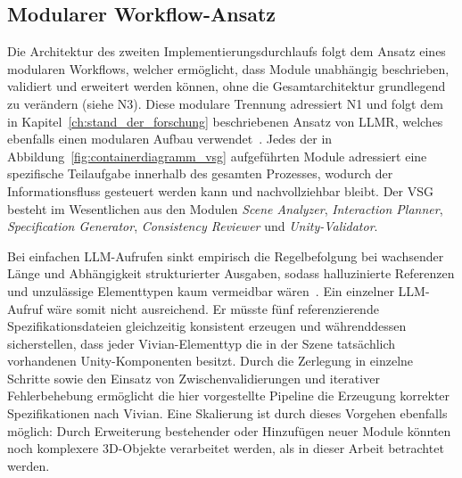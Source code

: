 \subsection{Modularer Workflow-Ansatz}\label{sec:begründung_modularer_workflow}

Die Architektur des zweiten Implementierungsdurchlaufs folgt dem Ansatz eines modularen Workflows, welcher ermöglicht, dass Module unabhängig beschrieben, validiert und erweitert werden können, ohne die Gesamtarchitektur grundlegend zu verändern (siehe N3).
Diese modulare Trennung adressiert N1 und folgt dem in Kapitel~\ref{ch:stand_der_forschung} beschriebenen Ansatz von LLMR, welches ebenfalls einen modularen Aufbau verwendet~\cite{delatorreLLMRRealtimePrompting2024}.
Jedes der in Abbildung~\ref{fig:containerdiagramm_vsg} aufgeführten Module adressiert eine spezifische Teilaufgabe innerhalb des gesamten Prozesses, wodurch der Informationsfluss gesteuert werden kann und nachvollziehbar bleibt.
Der VSG besteht im Wesentlichen aus den Modulen \textit{Scene Analyzer}, \textit{Interaction Planner}, \textit{Specification Generator}, \textit{Consistency Reviewer} und \textit{Unity-Validator}.

Bei einfachen LLM-Aufrufen sinkt empirisch die Regelbefolgung bei wachsender Länge und Abhängigkeit strukturierter Ausgaben, sodass halluzinierte Referenzen und unzulässige Elementtypen kaum vermeidbar wären~\cite{zhangLostintheMiddleLongTextGeneration2025}.
Ein einzelner LLM-Aufruf wäre somit nicht ausreichend. Er müsste fünf referenzierende Spezifikationsdateien gleichzeitig konsistent erzeugen und währenddessen sicherstellen, dass jeder Vivian-Elementtyp die in der Szene tatsächlich vorhandenen Unity-Komponenten besitzt.
Durch die Zerlegung in einzelne Schritte sowie den Einsatz von Zwischenvalidierungen und iterativer Fehlerbehebung ermöglicht die hier vorgestellte Pipeline die Erzeugung korrekter Spezifikationen nach Vivian.
Eine Skalierung ist durch dieses Vorgehen ebenfalls möglich: Durch Erweiterung bestehender oder Hinzufügen neuer Module könnten noch komplexere 3D-Objekte verarbeitet werden, als in dieser Arbeit betrachtet werden.
